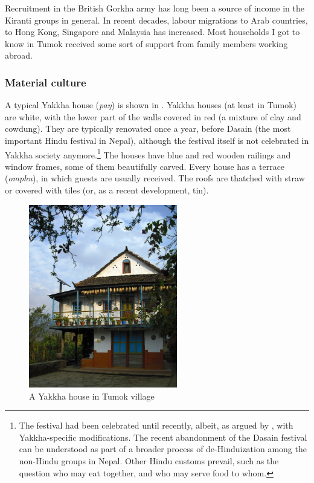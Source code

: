Recruitment in the British Gorkha army has long been a source of income in the Kiranti groups in general. In recent decades, labour migrations to Arab countries, to Hong Kong, Singapore and Malaysia has increased. Most households I got to know in Tumok received some sort of support from family members working abroad. 


\subsubsection{Material culture}

A typical Yakkha house (\emph{paŋ}) is shown in . Yakkha houses (at least in Tumok) are white, with the lower part of the walls covered in red (a mixture of clay and cowdung). They are typically renovated once a year, before Dasain (the most important Hindu festival in Nepal), although the festival itself is not celebrated in Yakkha society anymore.\footnote{The festival had been celebrated until recently, albeit, as argued by \citet{Russell2004Traditions}, with Yakkha-specific modifications. The recent abandonment of the Dasain festival can be understood as part of a broader process of de-Hinduization among the non-Hindu groups in Nepal. Other Hindu customs prevail, such as the question who may eat together, and who may serve food to whom.} The houses have blue and red wooden railings and window frames, some of them beautifully carved. Every house has a terrace (\emph{omphu}), in which guests are usually received. The roofs are thatched with straw or covered with tiles (or, as a recent development, tin).

\begin{figure}
\centering
\includegraphics[height=8cm]{figures/house.jpg}
\caption{A Yakkha house in Tumok village}\label{house}
\end{figure}


